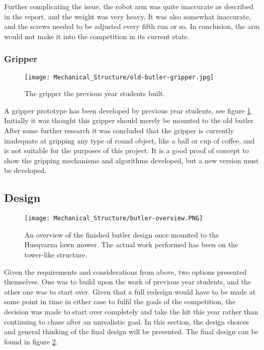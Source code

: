 Further complicating the issue, the robot arm was quite inaccurate as described in the report, and the weight was very heavy. It was also somewhat inaccurate, and the screws needed to be adjusted every fifth run or so. In conclusion, the arm would not make it into the competition in its current state.

\subsubsection{Gripper}

\begin{figure}[!ht]
    \centering
    \texttt{[image: Mechanical\_Structure/old-butler-gripper.jpg]}
    \caption{The gripper the previous year students built.}
    \label{fig:old_butler_gripper}
\end{figure}

A gripper prototype has been developed by previous year students, see figure \ref{fig:old_butler_gripper}. Initially it was thought this gripper should merely be mounted to the old butler. After some further research it was concluded that the gripper is currently inadequate at gripping any type of round object, like a ball or cup of coffee, and is not suitable for the purposes of this project. It is a good proof of concept to show the gripping mechanisms and algorithms developed, but a new version must be developed.

\subsection{Design}

\begin{figure}[!ht]
    \centering
    \texttt{[image: Mechanical\_Structure/butler-overview.PNG]}
    \caption{An overview of the finished butler design once mounted to the Husqvarna lawn mower. The actual work performed has been on the tower-like structure.}
    \label{fig:butler_overview}
\end{figure}

Given the requirements and considerations from above, two options presented themselves. One was to build upon the work of previous year students, and the other one was to start over. Given that a full redesign would have to be made at some point in time in either case to fulfil the goals of the competition, the decision was made to start over completely and take the hit this year rather than continuing to chase after an unrealistic goal. In this section, the design choices and general thinking of the final design will be presented. The final design can be found in figure \ref{fig:butler_overview}.

